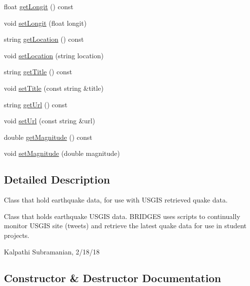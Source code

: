 \begin{DoxyCompactItemize}
float \mbox{\hyperlink{classbridges_1_1_earthquake_u_s_g_s_a0e600967c4e3865e369bb2ed46ba8db4}{get\+Longit}} () const
\item 
void \mbox{\hyperlink{classbridges_1_1_earthquake_u_s_g_s_a745dc27f3c68a3ae996ceb7771d89ec5}{set\+Longit}} (float longit)
\item 
string \mbox{\hyperlink{classbridges_1_1_earthquake_u_s_g_s_a2083945bebd769c943f0d3ee4580f2ab}{get\+Location}} () const
\item 
void \mbox{\hyperlink{classbridges_1_1_earthquake_u_s_g_s_a5dc533759cc900440d70bdfc68f16599}{set\+Location}} (string location)
\item 
string \mbox{\hyperlink{classbridges_1_1_earthquake_u_s_g_s_af6f2023df25731f96cd1a3d4ef1856d1}{get\+Title}} () const
\item 
void \mbox{\hyperlink{classbridges_1_1_earthquake_u_s_g_s_a2de7081d9124c85971b189c08f980469}{set\+Title}} (const string \&title)
\item 
string \mbox{\hyperlink{classbridges_1_1_earthquake_u_s_g_s_a3b63ab861f707e55d640e4c35c911997}{get\+Url}} () const
\item 
void \mbox{\hyperlink{classbridges_1_1_earthquake_u_s_g_s_a4ee05f6d980ba3101f598c6cfd04fdf2}{set\+Url}} (const string \&url)
\item 
double \mbox{\hyperlink{classbridges_1_1_earthquake_u_s_g_s_ac23a3187cae8cda0e2cc1321f8eef7b2}{get\+Magnitude}} () const
\item 
void \mbox{\hyperlink{classbridges_1_1_earthquake_u_s_g_s_aae8be6112f5c27c168c452261d9b29a2}{set\+Magnitude}} (double magnitude)
\end{DoxyCompactItemize}


\subsection{Detailed Description}
Class that hold earthquake data, for use with U\+S\+G\+IS retrieved quake data. 

Class that holds earthquake U\+S\+G\+IS data. B\+R\+I\+D\+G\+ES uses scripts to continually monitor U\+S\+G\+IS site (tweets) and retrieve the latest quake data for use in student projects.

Kalpathi Subramanian, 2/18/18 

\subsection{Constructor \& Destructor Documentation}
\mbox{\label{classbridges_1_1_earthquake_u_s_g_s_a540ae74c248da179fbbd182b843a14e0}} 
